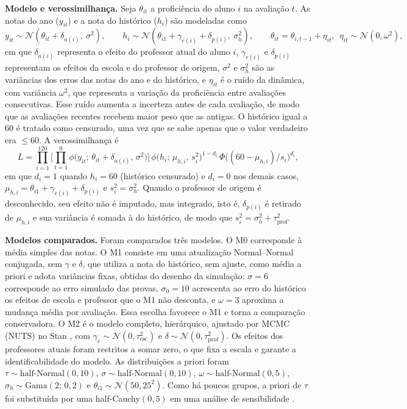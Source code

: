 \documentclass[12pt,a4paper]{article}
\begin{document}
\textbf{Modelo e verossimilhança.} Seja $\theta_{it}$ a proficiência do aluno $i$ na
avaliação $t$. As notas do ano ($y_{it}$) e a nota do histórico ($h_i$) são modeladas como
\begin{equation}
  y_{it} \sim \mathcal{N}(\theta_{it} + \delta_{a(i)},\ \sigma^2), \qquad
  h_i \sim \mathcal{N}(\theta_{i1} + \gamma_{e(i)} + \delta_{p(i)},\ \sigma_h^2), \qquad
  \theta_{it} = \theta_{i,t-1} + \eta_{it},\ \ \eta_{it} \sim \mathcal{N}(0, \omega^2),
\end{equation}
em que $\delta_{a(i)}$ representa o efeito do professor atual do aluno $i$, $\gamma_{e(i)}$ e
$\delta_{p(i)}$ representam os efeitos da escola e do professor de origem, $\sigma^2$ e
$\sigma_h^2$ são as variâncias dos erros das notas do ano e do histórico, e $\eta_{it}$ é o
ruído da dinâmica, com variância $\omega^2$, que representa a variação da proficiência entre
avaliações consecutivas. Esse ruído aumenta a incerteza antes de cada avaliação, de modo que as
avaliações recentes recebem maior peso que as antigas. O histórico igual a 60 é tratado como
censurado, uma vez que se sabe apenas que o valor verdadeiro era $\le 60$. A verossimilhança é
\begin{equation}
  L = \prod_{i=1}^{120}\Big[\prod_{t=1}^{9}\phi\big(y_{it};\,\theta_{it}+\delta_{a(i)},\,\sigma^2\big)\Big]
  \,\phi\big(h_i;\,\mu_{h,i},\,s_i^2\big)^{1-d_i}\,
  \Phi\big((60-\mu_{h,i})/s_i\big)^{d_i},
\end{equation}
em que $d_i = 1$ quando $h_i = 60$ (histórico censurado) e $d_i = 0$ nos demais casos,
$\mu_{h,i} = \theta_{i1}+\gamma_{e(i)}+\delta_{p(i)}$ e $s_i^2 = \sigma_h^2$. Quando o professor
de origem é desconhecido, seu efeito não é imputado, mas integrado, isto é, $\delta_{p(i)}$ é
retirado de $\mu_{h,i}$ e sua variância é somada à do histórico, de modo que
$s_i^2 = \sigma_h^2 + \tau_{\text{prof}}^2$.

\textbf{Modelos comparados.} Foram comparados três modelos. O M0 corresponde à média simples
das notas. O M1 consiste em uma atualização Normal--Normal conjugada, sem $\gamma$ e $\delta$,
que utiliza a nota do histórico, sem ajuste, como média a priori e adota variâncias fixas,
obtidas do desenho da simulação: $\sigma = 6$ corresponde ao erro simulado das provas,
$\sigma_0 = 10$ acrescenta ao erro do histórico os efeitos de escola e professor que o M1 não
desconta, e $\omega = 3$ aproxima a mudança média por avaliação. Essa escolha favorece o M1 e
torna a comparação conservadora. O M2 é o modelo completo, hierárquico, ajustado por MCMC
(NUTS) no Stan \citep{carpenter2017}, com $\gamma_e \sim \mathcal{N}(0, \tau_{\text{esc}}^2)$ e
$\delta \sim \mathcal{N}(0, \tau_{\text{prof}}^2)$. Os efeitos dos professores atuais foram
restritos a somar zero, o que fixa a escala e garante a identificabilidade do modelo. As
distribuições a priori foram $\tau \sim \text{half-Normal}(0, 10)$,
$\sigma \sim \text{half-Normal}(0, 10)$, $\omega \sim \text{half-Normal}(0, 5)$,
$\sigma_h \sim \text{Gama}(2;\,0{,}2)$ e $\theta_{i1} \sim \mathcal{N}(50, 25^2)$. Como há
poucos grupos, a priori de $\tau$ foi substituída por uma half-Cauchy$(0, 5)$ em uma análise de
sensibilidade \citep{gelman2006}.
\end{document}
